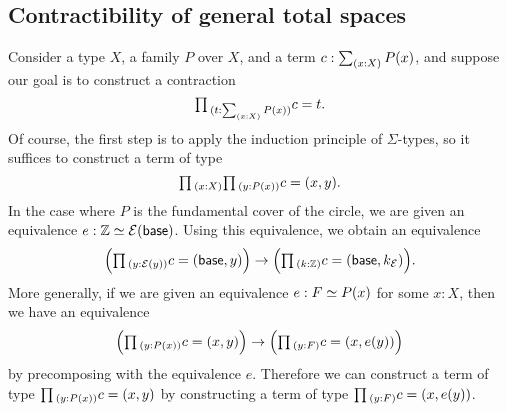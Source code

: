 \subsection{Contractibility of general total spaces}
Consider a type $X$, a family $P$ over $X$, and a term $c:\sm{x:X}P(x)$, and suppose our goal is to construct a contraction
\begin{equation*}
  \prd{t:\sm{x:X}P(x)}c=t.
\end{equation*}
Of course, the first step is to apply the induction principle of $\Sigma$-types, so it suffices to construct a term of type
\begin{equation*}
\prd{x:X}{y:P(x)} c = (x,y).
\end{equation*}
In the case where $P$ is the fundamental cover of the circle, we are given an equivalence $e:\eqv{\Z}{\mathcal{E}(\base)}$. Using this equivalence, we obtain an equivalence
\begin{equation*}
  \Big(\prd{y:\mathcal{E}(y)}c=(\mathsf{base},y)\Big)\to \Big(\prd{k:\Z}c=(\mathsf{base},k_{\mathcal{E}})\Big).
\end{equation*}
More generally, if we are given an equivalence $e:\eqv{F}{P(x)}$ for some $x:X$, then we have an equivalence
\begin{equation}
\Big(\prd{y:P(x)}c=(x,y)\Big) \to \Big(\prd{y:F}c=(x,e(y))\Big)
\end{equation}
by precomposing with the equivalence $e$. Therefore we can construct a term of type $\prd{y:P(x)}c=(x,y)$ by constructing a term of type $\prd{y:F}c=(x,e(y))$. 

